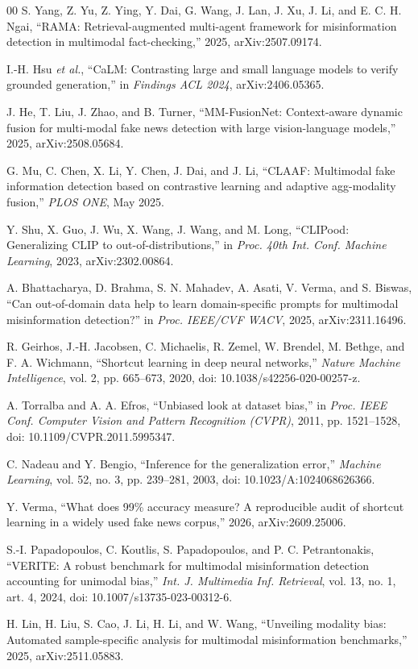 \documentclass[journal]{IEEEtran}
\begin{document}
\begin{thebibliography}{00}
 S. Yang, Z. Yu, Z. Ying, Y. Dai, G. Wang, J. Lan, J. Xu,
J. Li, and E. C. H. Ngai, ``RAMA: Retrieval-augmented multi-agent framework for
misinformation detection in multimodal fact-checking,'' 2025,
arXiv:2507.09174.

 I.-H. Hsu \emph{et al.}, ``CaLM: Contrasting large and small
language models to verify grounded generation,'' in \emph{Findings ACL 2024},
arXiv:2406.05365.

 J. He, T. Liu, J. Zhao, and B. Turner,
``MM-FusionNet: Context-aware dynamic fusion for multi-modal fake news
detection with large vision-language models,'' 2025, arXiv:2508.05684.

 G. Mu, C. Chen, X. Li, Y. Chen, J. Dai, and J. Li, ``CLAAF:
Multimodal fake information detection based on contrastive learning and
adaptive agg-modality fusion,'' \emph{PLOS ONE}, May 2025.

 Y. Shu, X. Guo, J. Wu, X. Wang, J. Wang, and M. Long,
``CLIPood: Generalizing CLIP to out-of-distributions,'' in \emph{Proc. 40th
Int. Conf. Machine Learning}, 2023, arXiv:2302.00864.

 A. Bhattacharya, D. Brahma, S. N. Mahadev, A. Asati,
V. Verma, and S. Biswas, ``Can out-of-domain data help to learn domain-specific prompts for
multimodal misinformation detection?'' in \emph{Proc. IEEE/CVF WACV}, 2025,
arXiv:2311.16496.

 R. Geirhos, J.-H. Jacobsen, C. Michaelis, R. Zemel,
W. Brendel, M. Bethge, and F. A. Wichmann, ``Shortcut learning in deep neural
networks,'' \emph{Nature Machine Intelligence}, vol. 2, pp. 665--673, 2020,
doi: 10.1038/s42256-020-00257-z.

 A. Torralba and A. A. Efros, ``Unbiased look at dataset
bias,'' in \emph{Proc. IEEE Conf. Computer Vision and Pattern Recognition
(CVPR)}, 2011, pp. 1521--1528, doi: 10.1109/CVPR.2011.5995347.

 C. Nadeau and Y. Bengio, ``Inference for the generalization
error,'' \emph{Machine Learning}, vol. 52, no. 3, pp. 239--281, 2003,
doi: 10.1023/A:1024068626366.

 Y. Verma, ``What does 99\% accuracy measure? A reproducible
audit of shortcut learning in a widely used fake news corpus,'' 2026,
arXiv:2609.25006.

 S.-I. Papadopoulos, C. Koutlis, S. Papadopoulos, and
P. C. Petrantonakis, ``VERITE: A robust benchmark for multimodal misinformation
detection accounting for unimodal bias,'' \emph{Int. J. Multimedia Inf.
Retrieval}, vol. 13, no. 1, art. 4, 2024, doi: 10.1007/s13735-023-00312-6.

 H. Lin, H. Liu, S. Cao, J. Li, H. Li, and W. Wang,
``Unveiling modality bias: Automated sample-specific analysis for multimodal
misinformation benchmarks,'' 2025, arXiv:2511.05883.

\end{thebibliography}
\end{document}
